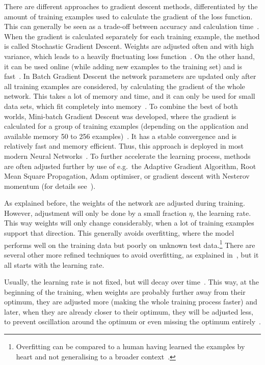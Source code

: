 There are different approaches to gradient descent methods, differentiated by the amount of training examples used to calculate the gradient of the loss function.
This can generally be seen as a trade-off between accuracy and calculation time~\autocite{Ruder2017}.
When the gradient is calculated separately for each training example, the method is called Stochastic Gradient Descent.
Weights are adjusted often and with high variance, which leads to a heavily fluctuating loss function~\autocite{Ruder2017}.
On the other hand, it can be used online (while adding new examples to the training set) and is fast~\autocite{Ruder2017}.
In Batch Gradient Descent the network parameters are updated only after all training examples are considered, by calculating the gradient of the whole network.
This takes a lot of memory and time, and it can only be used for small data sets, which fit completely into memory~\autocite{Ruder2017}.
To combine the best of both worlds, Mini-batch Gradient Descent was developed, where the gradient is calculated for a group of training examples (depending on the application and available memory 50 to 256 examples)~\autocite{Ruder2017}.
It has a stable convergence and is relatively fast and memory efficient.
Thus, this approach is deployed in most modern Neural Networks~\autocite{Ruder2017}.
To further accelerate the learning process, methods are often adjusted further by use of e.g.~the Adaptive Gradient Algorithm, Root Mean Square Propagation, Adam optimiser, or gradient descent with Nesterov momentum (for details see~\autocite[Chapter~3.5.1]{Aggarwal2018}).

As explained before, the weights of the network are adjusted during training.
However, adjustment will only be done by a small fraction $\eta$, the learning rate.
This way weights will only change considerably, when a lot of training examples support that direction.
This generally avoids overfitting, where the model performs well on the training data but poorly on unknown test data.\footnote{Overfitting can be compared to a human having learned the examples by heart and not generalising to a broader context~\autocite{Alzubaidi2021}.}
There are several other more refined techniques to avoid overfitting, as explained in~\autocite[Chapter~5.3]{Skansi2018}, but it all starts with the learning rate.

Usually, the learning rate is not fixed, but will decay over time~\autocite[Chapter~3.5.1]{Aggarwal2018}.
This way, at the beginning of the training, when weights are probably further away from their optimum, they are adjusted more (making the whole training process faster) and later, when they are already closer to their optimum, they will be adjusted less, to prevent oscillation around the optimum or even missing the optimum entirely~\autocite[Chapter~3.5.1]{Aggarwal2018}.

